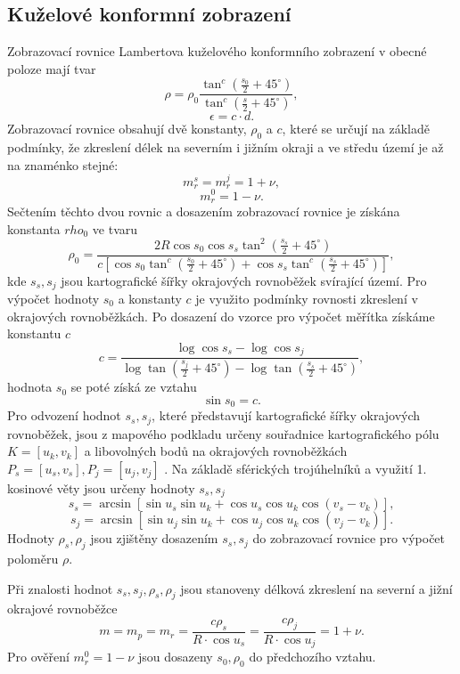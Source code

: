 \documentclass[12pt]{article}
\begin{document}
\subsection{Kuželové konformní zobrazení}
Zobrazovací rovnice Lambertova kuželového konformního zobrazení v obecné poloze mají tvar
\[
\rho = \rho_0 \frac{\tan^c\left(\frac{s_0}{2} + 45^\circ\right)}{\tan^c\left(\frac{s}{2} + 45^\circ\right)},
\]
\[
\epsilon = c \cdot d.
\]
Zobrazovací rovnice obsahují dvě konstanty, $\rho_0$ a $c$, které se určují na základě podmínky, že zkreslení délek na severním i jižním okraji a ve středu území je až na znaménko stejné:
\[
m_r^s = m_r^j = 1 + \nu,
\]
\[
m_r^0 = 1 - \nu.
\]
Sečtením těchto dvou rovnic a dosazením zobrazovací rovnice je získána konstanta $rho_0$ ve tvaru
\[
\rho_0 = \frac{2R \cos s_0 \cos s_s \tan^2\left(\frac{s_s}{2} + 45^\circ\right)}{c \left[ \cos s_0 \tan^c\left(\frac{s_0}{2} + 45^\circ\right) + \cos s_s \tan^c\left(\frac{s_s}{2} + 45^\circ\right) \right]},
\]
kde $s_s, s_j$ jsou kartografické šířky okrajových rovnoběžek svírající území. Pro výpočet hodnoty $s_0$ a konstanty $c$ je využito podmínky rovnosti zkreslení v okrajových rovnoběžkách. Po dosazení do vzorce pro výpočet měřítka získáme konstantu $c$
\[
c = \frac{\log \cos s_s - \log \cos s_j}{\log \tan \left(\frac{s_j}{2} + 45^\circ\right) - \log \tan \left(\frac{s_s}{2} + 45^\circ\right)},
\]
hodnota $s_0$ se poté získá ze vztahu
\[
\sin s_0 = c.
\]
Pro odvození hodnot $s_s, s_j$, které představují kartografické šířky okrajových rovnoběžek, jsou z mapového podkladu určeny souřadnice kartografického pólu $K = [u_k, v_k]$ a libovolných bodů na okrajových rovnoběžkách $P_s = [u_s, v_s], P_j = [u_j, v_j]$ . Na základě sférických trojúhelníků a využití 1. kosinové věty jsou určeny hodnoty $s_s, s_j$
\[
s_s = \arcsin \left[ \sin u_s \sin u_k + \cos u_s \cos u_k \cos(v_s - v_k) \right],
\]
\[
s_j = \arcsin \left[ \sin u_j \sin u_k + \cos u_j \cos u_k \cos(v_j - v_k) \right].
\]
Hodnoty $\rho_s, \rho_j$ jsou zjištěny dosazením $s_s, s_j$ do zobrazovací rovnice pro výpočet poloměru $\rho$.

Při znalosti hodnot $s_s, s_j, \rho_s, \rho_j$ jsou stanoveny délková zkreslení na severní a jižní okrajové rovnoběžce
\[
m = m_p = m_r = \frac{c \rho_s}{R \cdot \cos u_s} = \frac{c \rho_j}{R \cdot \cos u_j} = 1 + \nu.
\]
Pro ověření $m_r^0 = 1 - \nu$ jsou dosazeny $s_0, \rho_0$ do předchozího vztahu.
\end{document}
